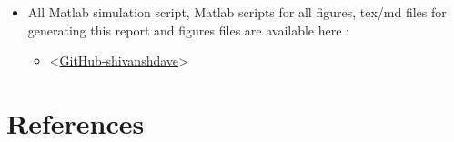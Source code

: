 \documentclass[
]{article}
\providecommand{\tightlist}{%
  \setlength{\itemsep}{0pt}\setlength{\parskip}{0pt}}
\begin{document}
\begin{itemize}
\tightlist
\item
  All Matlab simulation script, Matlab scripts for all figures, tex/md files for generating this report and figures files are available here :

  \begin{itemize}
  \tightlist
  \item
    \textless{}\href{https://github.com/shivanshdave/ML_HCO_sync}{GitHub-shivanshdave}\textgreater{}
  \end{itemize}
\end{itemize}

\hypertarget{references}{%
\section*{References}\label{references}}
\end{document}
